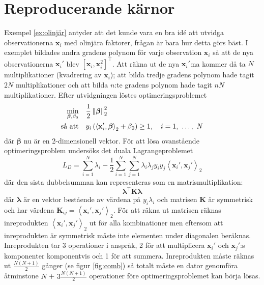 \documentclass[a4paper, 12pt]{report}
\theoremstyle{definition}
\theoremstyle{remark}
\newcommand{\bfbeta}{{\boldsymbol{\beta}}}
\newcommand{\bfx}{\mathbf{x}}
\newcommand{\llangle}{\left\langle}
\newcommand{\rrangle}{\right\rangle}
\newcommand{\inner}[2]{\llangle #1, #2 \rrangle}
\begin{document}
\chapter{Reproducerande kärnor}
Exempel \ref{ex:olinjär} antyder att det kunde vara en bra idé att utvidga observationerna $\mathbf{x}_i$ med olinjära faktorer, frågan är bara hur detta görs bäst. I exemplet bildades andra gradens polynom för varje observation $\bfx_i$ så att de nya observationerna $\bfx_i'$ blev $\left[\bfx_i, \bfx_i^2\right]^\intercal$. Att räkna ut de nya $\bfx_i'$:na kommer då ta $N$ multiplikationer (kvadrering av $\bfx_i$); att bilda tredje gradens polynom hade tagit $2N$ multiplikationer och att bilda $n$:te gradens polynom hade tagit $nN$ multiplikationer. Efter utvidgningen löstes optimeringsproblemet 
\begin{equation*}
\begin{aligned}
\operatornamewithlimits{min}_{\bfbeta, \beta_0} & & &\frac{1}{2}\left\|\bfbeta
\right\|_2^2\\
\text{så att} & & &y_i\left(\inner{\bfx_i'}{\bfbeta}_2+\beta_0\right)\geq 1,\quad i=1,~\dots,~N
\end{aligned}
\end{equation*}
där $\bfbeta$ nu är en 2-dimensionell vektor. För att lösa ovanstående optimeringsproblem undersöks det duala Lagrangeproblemet
\begin{equation*}
		L_D= \sum_{i=1}^{N}\lambda_i - \frac{1}{2}\sum_{i=1}^{N}\sum_{j=1}^{N}\lambda_i\lambda_jy_iy_j\inner{\bfx_i'}{\bfx_j'}_2
\end{equation*}
där den sista dubbelsumman kan representeras som en matrismultiplikation:
\begin{equation*}
	\boldsymbol{\lambda}^\intercal\mathbf{K}\boldsymbol{\lambda}
\end{equation*}
där $\boldsymbol{\lambda}$ är en vektor bestående av värdena på $y_i\lambda_i$ och matrisen $\mathbf{K}$ är symmetrisk och har värdena $\mathbf{K}_{ij}=\inner{\bfx_i'}{\bfx_j'}_2$. För att räkna ut matrisen räknas inreprodukten $\inner{\bfx_i'}{\bfx_j'}_2$ ut för alla kombinationer men eftersom att inreprodukten är symmetrisk måste inte elementen under diagonalen beräknas. Inreprodukten tar 3 operationer i anspråk, 2 för att multiplicera $\bfx_i'$ och $\bfx_j'$:s komponenter komponentvis och 1 för att summera. Inreprodukten måste räknas ut $\frac{N(N+1)}{2}$ gånger (se figur \ref{fig:comb}) så totalt måste en dator genomföra åtminstone $N$ + $3\frac{N(N+1)}{2}$ operationer före optimeringsproblemet kan börja lösas.
\end{document}
